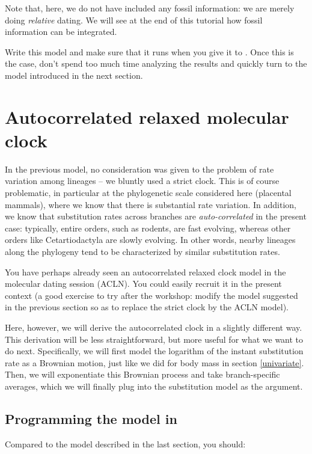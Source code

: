 Note that, here, we do not have included any fossil information: we are merely doing \emph{relative} dating. We will see at the end of this tutorial how fossil information can be integrated.

Write this model and make sure that it runs when you give it to . Once this is the case, don't spend too much time analyzing the results and quickly turn to the model introduced in the next section.

\section{Autocorrelated relaxed molecular clock}

In the previous model, no consideration was given to the problem of rate variation among lineages --
we bluntly used a strict clock. This is of course problematic, in particular at the phylogenetic scale considered here (placental mammals), where we know that there is substantial rate variation. In addition, we know that substitution rates across branches are \emph{auto-correlated} in the present case: typically, entire orders, such as rodents, are fast evolving, whereas other orders like Cetartiodactyla are slowly evolving. In other words, nearby lineages along the phylogeny tend to be characterized by similar substitution rates.

You have perhaps already seen an autocorrelated relaxed clock model in the molecular dating session (ACLN). You could easily recruit it in the present context (a good exercise to try after the workshop: modify the model suggested in the previous section so as to replace the strict clock by the ACLN model).

Here, however, we will derive the autocorrelated clock in a slightly different way. This derivation will be less straightforward, but more useful for what we want to do next.
Specifically, we will first model the logarithm of the instant substitution rate as a Brownian motion, just like we did for body mass in section \ref{univariate}. Then, we will exponentiate this Brownian process and take branch-specific averages, which we will finally plug into the substitution model as the  argument.

\subsection{Programming the model in \RevBayes}

Compared to the model described in the last section, you should:


